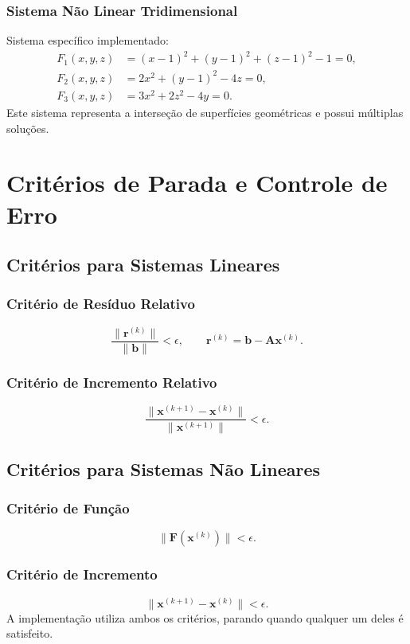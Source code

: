 \documentclass[12pt,a4paper]{article}
\begin{document}
\subsubsection*{Sistema Não Linear Tridimensional}
Sistema específico implementado:
\[
\begin{aligned}
F_1(x,y,z) &= (x-1)^2 + (y-1)^2 + (z-1)^2 - 1 = 0,\\
F_2(x,y,z) &= 2x^2 + (y-1)^2 - 4z = 0,\\
F_3(x,y,z) &= 3x^2 + 2z^2 - 4y = 0.
\end{aligned}
\]
Este sistema representa a interseção de superfícies geométricas e possui múltiplas soluções.

\section{Critérios de Parada e Controle de Erro}

\subsection{Critérios para Sistemas Lineares}

\subsubsection*{Critério de Resíduo Relativo}
\[
\frac{\lVert \mathbf{r}^{(k)} \rVert}{\lVert \mathbf{b} \rVert} < \epsilon,
\qquad
\mathbf{r}^{(k)} = \mathbf{b} - \mathbf{A}\mathbf{x}^{(k)}.
\]

\subsubsection*{Critério de Incremento Relativo}
\[
\frac{\lVert \mathbf{x}^{(k+1)} - \mathbf{x}^{(k)} \rVert}{\lVert \mathbf{x}^{(k+1)} \rVert} < \epsilon.
\]

\subsection{Critérios para Sistemas Não Lineares}

\subsubsection*{Critério de Função}
\[
\lVert \mathbf{F}(\mathbf{x}^{(k)}) \rVert < \epsilon.
\]

\subsubsection*{Critério de Incremento}
\[
\lVert \mathbf{x}^{(k+1)} - \mathbf{x}^{(k)} \rVert < \epsilon.
\]
A implementação utiliza ambos os critérios, parando quando qualquer um deles é satisfeito.
\end{document}
